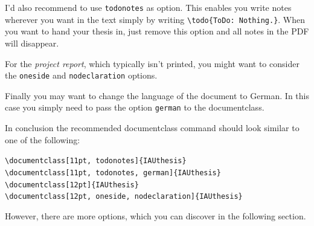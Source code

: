 \documentclass[12pt, todonotes, nodeclaration, oneside, fancypagenumbers, notof, notot, noabstract]{IAUthesis}
\newcommand{\code}[1]{\colorbox{black!10!white}{\texttt{#1}}}
\begin{document}
I'd also recommend to use \code{todonotes} as option. This enables you write notes wherever you want in the text simply by writing \code{\textbackslash{}todo\{ToDo: Nothing.\}}. When you want to hand your thesis in, just remove this option and all notes in the PDF will disappear.

For the \emph{project report}, which typically isn't printed, you might want to consider the \code{oneside} and \code{nodeclaration} options.

Finally you may want to change the language of the document to German. In this case you simply need to pass the option \code{german} to the documentclass.\medskip

\noindent In conclusion the recommended documentclass command should look similar to one of the following:

\noindent\texttt{\textbackslash{}documentclass[11pt, todonotes]\{IAUthesis\}\\\textbackslash{}documentclass[11pt, todonotes, german]\{IAUthesis\}\\\textbackslash{}documentclass[12pt]\{IAUthesis\}\\\textbackslash{}documentclass[12pt, oneside, nodeclaration]\{IAUthesis\}}

\noindent However, there are more options, which you can discover in the following section.

\clearpage
\end{document}
